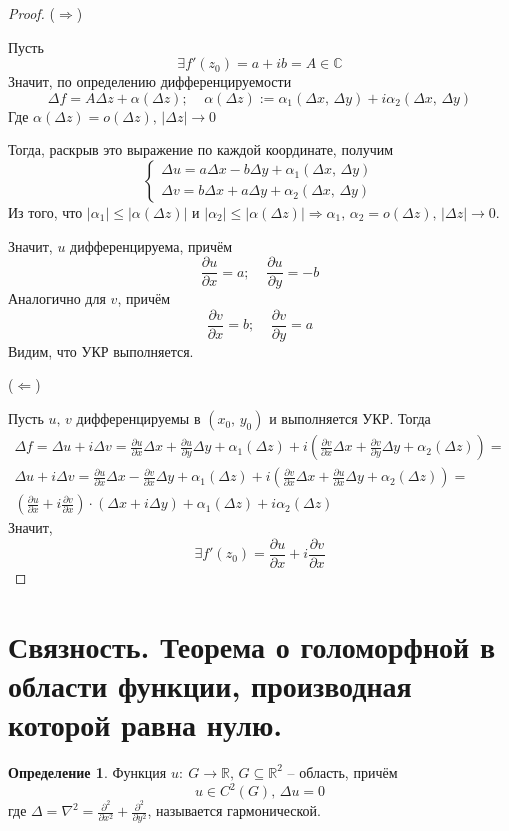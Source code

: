 \documentclass[a4paper,12pt]{article}
\renewcommand{\leq}{\ensuremath{\leqslant}}
\theoremstyle{plain}
\theoremstyle{definition}
\newtheorem{definition}{Определение}[section]
\theoremstyle{remark}
\begin{document}
\begin{proof}
	($\Rightarrow$)

	Пусть
	\[
		\exists f'(z_0) = a + ib = A \in \mathbb{C}
	\]
	Значит, по определению дифференцируемости
	\[
		\Delta f = A\Delta z + \alpha(\Delta z);\;\;\;\; \alpha(\Delta z) := \alpha_1(\Delta x,\, \Delta y) + i\alpha_2(\Delta x,\, \Delta y)
	\]
	Где $\alpha(\Delta z) = o(\Delta z),\, \vert\Delta z\vert \to 0$

	Тогда, раскрыв это выражение по каждой координате, получим
	\[
		\begin{cases}
			\Delta u = a\Delta x - b\Delta y + \alpha_1(\Delta x,\, \Delta y) \\
			\Delta v = b\Delta x + a \Delta y + \alpha_2(\Delta x,\, \Delta y)
		\end{cases}
	\]
	Из того, что $\vert\alpha_1\vert \leq \vert \alpha(\Delta z)\vert$ и $\vert\alpha_2\vert \leq \vert \alpha(\Delta z)\vert \Rightarrow \alpha_1,\, \alpha_2 = o(\Delta z),\, \vert \Delta z\vert \to 0$.

	Значит, $u$ дифференцируема, причём
	\[
		\frac{\partial u}{\partial x} = a ;\;\;\;\; \frac{\partial u}{\partial y} = -b
	\]
	Аналогично для $v$, причём
	\[
		\frac{\partial v}{\partial x} = b ;\;\;\;\; \frac{\partial v}{\partial y} = a
	\]
	Видим, что УКР выполняется.

	($\Leftarrow$)

	Пусть $u,\, v$ дифференцируемы в $(x_0,\, y_0)$ и выполняется УКР. Тогда
	\begin{align*}
		\Delta f = \Delta u + i\Delta v = \frac{\partial u}{\partial x}\Delta x + \frac{\partial u}{\partial y}\Delta y + \alpha_1(\Delta z) + i\left(\frac{\partial v}{\partial x}\Delta x + \frac{\partial v}{\partial y}\Delta y + \alpha_2(\Delta z)\right) = \\
		\Delta u + i\Delta v = \frac{\partial u}{\partial x}\Delta x - \frac{\partial v}{\partial x}\Delta y + \alpha_1(\Delta z) + i\left(\frac{\partial v}{\partial x}\Delta x + \frac{\partial u}{\partial x}\Delta y + \alpha_2(\Delta z)\right) =            \\
		\left(\frac{\partial u}{\partial x} + i\frac{\partial v}{\partial x}\right)\cdot(\Delta x + i\Delta y) + \alpha_1(\Delta z) + i\alpha_2(\Delta z)
	\end{align*}
	Значит,
	\[
		\exists f'(z_0) = \frac{\partial u}{\partial x} +i\frac{\partial v}{\partial x}
	\]
\end{proof}

\section{Связность. Теорема о голоморфной в области функции, производная которой равна нулю.}
\begin{definition}
	Функция $u :\: G \to \mathbb{R},\, G \subseteq \mathbb{R}^2$ -- область, причём
	\[
		u \in C^2(G),\, \Delta u = 0
	\]
	где $\Delta = \nabla^2 = \frac{\partial^2}{\partial x^2} + \frac{\partial^2}{\partial y^2}$, называется гармонической.
\end{definition}
\end{document}
